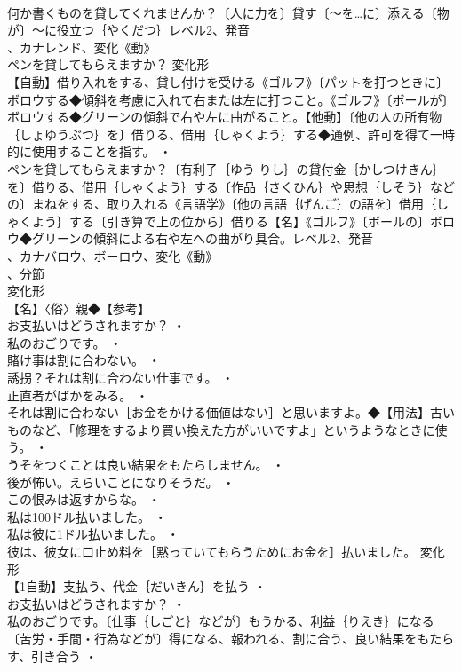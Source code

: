 \documentclass[8pt]{extreport}
\begin{document}
\begin{CJK}{UTF8}{min}
\\	何か書くものを貸してくれませんか？〔人に力を〕貸す〔～を…に〕添える〔物が〕～に役立つ｛やくだつ｝レベル2、発音
\\	、カナレンド、変化《動》
\\	ペンを貸してもらえますか？	変化形 
\\	【自動】借り入れをする、貸し付けを受ける《ゴルフ》〔パットを打つときに〕ボロウする◆傾斜を考慮に入れて右または左に打つこと。《ゴルフ》〔ボールが〕ボロウする◆グリーンの傾斜で右や左に曲がること。【他動】〔他の人の所有物｛しょゆうぶつ｝を〕借りる、借用｛しゃくよう｝する◆通例、許可を得て一時的に使用することを指す。 ・
\\	ペンを貸してもらえますか？〔有利子｛ゆう りし｝の貸付金｛かしつけきん｝を〕借りる、借用｛しゃくよう｝する〔作品｛さくひん｝や思想｛しそう｝などの〕まねをする、取り入れる《言語学》〔他の言語｛げんご｝の語を〕借用｛しゃくよう｝する〔引き算で上の位から〕借りる【名】《ゴルフ》〔ボールの〕ボロウ◆グリーンの傾斜による右や左への曲がり具合。レベル2、発音
\\	、カナバロウ、ボーロウ、変化《動》
\\	、分節
\\	変化形 
\\	【名】〈俗〉親◆【参考】
\\	お支払いはどうされますか？ ・
\\	私のおごりです。 ・
\\	賭け事は割に合わない。 ・
\\	誘拐？それは割に合わない仕事です。 ・
\\	正直者がばかをみる。 ・
\\	それは割に合わない［お金をかける価値はない］と思いますよ。◆【用法】古いものなど、「修理をするより買い換えた方がいいですよ」というようなときに使う。 ・
\\	うそをつくことは良い結果をもたらしません。 ・
\\	後が怖い。えらいことになりそうだ。 ・
\\	この恨みは返すからな。 ・
\\	私は100ドル払いました。 ・
\\	私は彼に1ドル払いました。 ・
\\	彼は、彼女に口止め料を［黙っていてもらうためにお金を］払いました。	変化形 
\\	【1自動】支払う、代金｛だいきん｝を払う ・
\\	お支払いはどうされますか？ ・
\\	私のおごりです。〔仕事｛しごと｝などが〕もうかる、利益｛りえき｝になる〔苦労・手間・行為などが〕得になる、報われる、割に合う、良い結果をもたらす、引き合う ・

\end{CJK}
\end{document}
